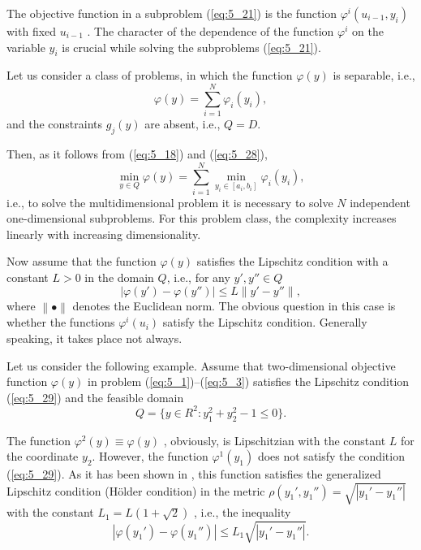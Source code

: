 The objective function in a subproblem (\ref{eq:5_21}) is the function $\varphi^i(u_{i-1},y_i)$  with fixed $u_{i-1}$ . The character of the dependence of the function $\varphi^i$  on the variable $y_i$  is crucial while solving the subproblems (\ref{eq:5_21}).

Let us consider a class of problems, in which the function $\varphi(y)$ is separable, i.e.,
\begin{equation}
\label{eq:5_28}
\varphi(y)=\sum_{i=1}^N{\varphi_i(y_i)},
\end{equation}
and the constraints $g_j(y)$  are absent, i.e., $Q=D$.

Then, as it follows from (\ref{eq:5_18}) and (\ref{eq:5_28}), 
\begin{displaymath}
\min_{y\in Q}\varphi(y)=\sum_{i=1}^N{\min_{y_i\in [a_i,b_i]}\varphi_i(y_i)},
\end{displaymath}
i.e., to solve the multidimensional problem it is necessary to solve $N$ independent one-dimensional subproblems. For this problem class, the complexity increases linearly with increasing dimensionality. 

Now assume that the function $\varphi(y)$ satisfies the Lipschitz condition with a constant $L>0$ in the domain $Q$, i.e., for any $y',y''\in Q$
\begin{equation}
\label{eq:5_29}
\left|\varphi(y')-\varphi(y'')\right|\leq L\left\|y'-y''\right\|,
\end{equation}
where $\left\|\bullet\right\|$ denotes the Euclidean norm. The obvious question in this case is whether the functions $\varphi^i(u_i)$  satisfy the Lipschitz condition. Generally speaking, it takes place not always.

Let us consider the following example. Assume that two-dimensional objective function $\varphi(y)$  in problem (\ref{eq:5_1})--(\ref{eq:5_3}) satisfies the Lipschitz condition (\ref{eq:5_29}) and the feasible domain  
\begin{displaymath}
Q=\{y\in R^2:y_1^2+y_2^2-1\leq 0\}.
\end{displaymath}

The function $\varphi^2(y)\equiv \varphi(y)$ , obviously, is Lipschitzian with the constant $L$ for the coordinate $y_2$. However, the function $\varphi^1(y_1)$  does not satisfy the condition (\ref{eq:5_29}). As it has been shown in \cite{5_StrMonRus}, this function satisfies the generalized Lipschitz condition (H{\"o}lder condition) in the metric $\rho(y_1',y_1'')=\sqrt{\left|y_1'-y_1''\right|}$  with the constant $L_1=L(1+\sqrt{2})$ , i.e., the inequality 
\begin{displaymath}
\left|\varphi(y_1')-\varphi(y_1'')\right|\leq L_1\sqrt{\left|y_1'-y_1''\right|}.
\end{displaymath}

